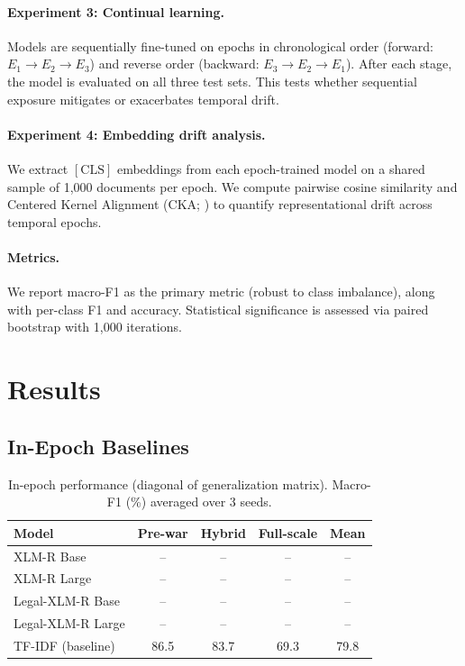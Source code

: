 \documentclass[11pt]{article}
\begin{document}
\paragraph{Experiment 3: Continual learning.}
Models are sequentially fine-tuned on epochs in chronological order (forward: $E_1 \rightarrow E_2 \rightarrow E_3$) and reverse order (backward: $E_3 \rightarrow E_2 \rightarrow E_1$). After each stage, the model is evaluated on all three test sets. This tests whether sequential exposure mitigates or exacerbates temporal drift.

\paragraph{Experiment 4: Embedding drift analysis.}
We extract $[\text{CLS}]$ embeddings from each epoch-trained model on a shared sample of 1,000 documents per epoch. We compute pairwise cosine similarity and Centered Kernel Alignment (CKA; \citealt{kornblith2019similarity}) to quantify representational drift across temporal epochs.

\paragraph{Metrics.}
We report macro-F1 as the primary metric (robust to class imbalance), along with per-class F1 and accuracy. Statistical significance is assessed via paired bootstrap with 1,000 iterations.

\section{Results}


\subsection{In-Epoch Baselines}

\begin{table}[t]
\centering
\small
\caption{In-epoch performance (diagonal of generalization matrix). Macro-F1 (\%) averaged over 3 seeds.}
\label{tab:in_epoch}
\begin{tabular}{lcccc}
\toprule
\textbf{Model} & \textbf{Pre-war} & \textbf{Hybrid} & \textbf{Full-scale} & \textbf{Mean} \\
\midrule
XLM-R Base         & -- & -- & -- & -- \\
XLM-R Large        & -- & -- & -- & -- \\
Legal-XLM-R Base   & -- & -- & -- & -- \\
Legal-XLM-R Large  & -- & -- & -- & -- \\
\midrule
TF-IDF (baseline)  & 86.5 & 83.7 & 69.3 & 79.8 \\
\bottomrule
\end{tabular}
\end{table}
\end{document}

